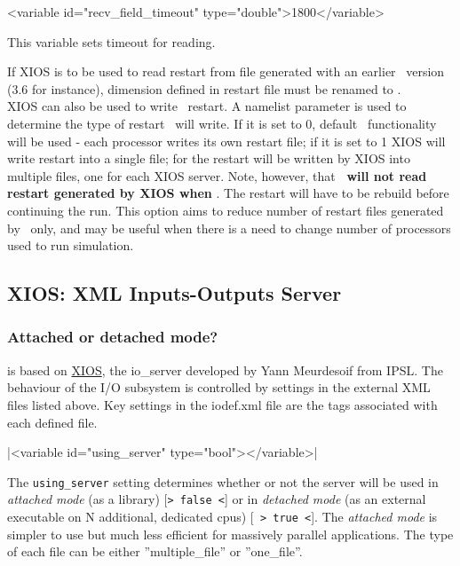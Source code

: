 \documentclass[../main/NEMO_manual]{subfiles}
\begin{document}
\begin{xmllines}
<variable id="recv_field_timeout"        type="double">1800</variable>
\end{xmllines}

This variable sets timeout for reading.

If XIOS is to be used to read restart from file generated with an earlier \NEMO\ version (3.6 for instance),
dimension  defined in restart file must be renamed to .\\

XIOS can also be used to write \NEMO\ restart. A namelist parameter  is used to determine the
type of restart \NEMO\ will write. If it is set to 0, default \NEMO\ functionality will be used - each
processor writes its own restart file; if it is set to 1 XIOS will write restart into a single file;
for  the restart will be written by XIOS into multiple files, one for each XIOS server.
Note, however, that \textbf{\NEMO\ will not read restart generated by XIOS when }. The restart will
have to be rebuild before continuing the run. This option aims to reduce number of restart files generated by \NEMO\ only,
and may be useful when there is a need to change number of processors used to run simulation.

\subsection{XIOS: XML Inputs-Outputs Server}

\subsubsection{Attached or detached mode?}

 is based on \href{http://forge.ipsl.jussieu.fr/ioserver/wiki}{XIOS},
the io\_server developed by Yann Meurdesoif from IPSL.
The behaviour of the I/O subsystem is controlled by settings in the external XML files listed above.
Key settings in the iodef.xml file are the tags associated with each defined file.

\xmlline|<variable id="using_server" type="bool"></variable>|

The \texttt{using\_server} setting determines whether or not the server will be used in
\textit{attached mode}
(as a library) [\texttt{> false <}] or in \textit{detached mode}
(as an external executable on N additional, dedicated cpus) [\texttt{ > true <}].
The \textit{attached mode} is simpler to use but much less efficient for
massively parallel applications.
The type of each file can be either ''multiple\_file'' or ''one\_file''.
\end{document}
